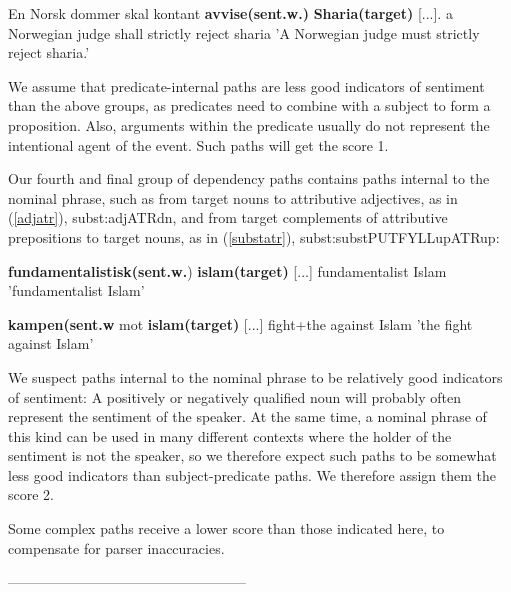 \documentclass[11pt]{article}
\begin{document}
	\begin{examples}
	\item\label{objverb}
	\gll En Norsk dommer skal kontant \textbf{avvise(sent.w.)} \textbf{Sharia(target)} [...].
	a Norwegian judge shall strictly reject sharia {}
	\glt 'A Norwegian judge must strictly reject sharia.'
	\glend
	\end{examples}
	
	We assume that predicate-internal paths are less good indicators of sentiment than the above groups, as predicates need to combine with a subject to form a proposition. Also, arguments within the predicate usually do not represent the intentional agent of the event. Such paths will get the score 1.
	
	Our fourth and final group of dependency paths contains paths internal to the nominal phrase, such as from target nouns to attributive adjectives, as in (\ref{adjatr}), subst:adj{\textunderscore}{\textunderscore}ATR{\textunderscore}dn, and from target complements of attributive prepositions to target nouns, as in (\ref{substatr}), subst:subst{\textunderscore}{\textunderscore}PUTFYLL{\textunderscore}up{\textunderscore}{\textunderscore}ATR{\textunderscore}up:
	
	\begin{examples}
	\item\label{adjatr}
	\gll [...] \textbf{fundamentalistisk(sent.w.}) \textbf{islam(target)} [...]
	{} fundamentalist Islam {}
	\glt 'fundamentalist Islam'
	\glend
	
	\item\label{substatr}
	\gll [...] \textbf{kampen(sent.w} mot \textbf{islam(target)} [...]
	{} fight+the against Islam {}
	\glt 'the fight against Islam'
	\glend
	
	\end{examples}
	
	We suspect paths internal to the nominal phrase to be relatively good indicators of sentiment: A positively or negatively qualified noun will probably often represent the sentiment of the speaker. At the same time, a nominal phrase of this kind can be used in many different contexts where the holder of the sentiment is not the speaker, so we therefore expect such paths to be somewhat less good indicators than subject-predicate paths. We therefore assign them the score 2.
	
	Some complex paths receive a lower score than those indicated here, to compensate for parser inaccuracies.

---------------------------------------------------
\end{document}
